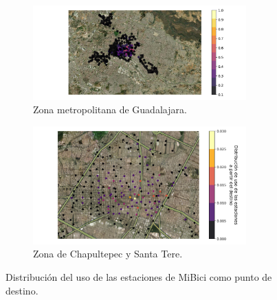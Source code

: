\begin{figure}[H]
    \centering
    \begin{subfigure}[b]{8.2cm}
        \includegraphics[width=8.2cm]{Graphics/repetition_destino.png}
        \caption{Zona metropolitana de Guadalajara.}
        \label{fig:distribution_station_all_destiny}
    \end{subfigure}
    \begin{subfigure}[b]{8.2cm}
        \includegraphics[width=8.2cm]{Graphics/repetition_destino_zoom.png}
        \caption{Zona de Chapultepec y Santa Tere.}
        \label{fig:distribution_station_zoom_destiny}
    \end{subfigure}
    \caption{Distribución del uso de las estaciones de MiBici como punto de destino.}
    \label{fig:distribution_destiny}
\end{figure}

